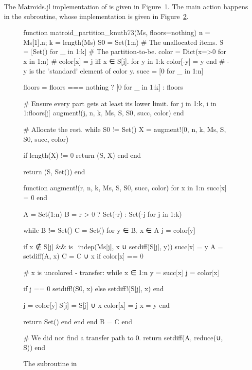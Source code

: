 The Matroids.jl implementation of  is given in Figure~\ref{code:matroid_partition_knuth73}. The main action happens in the  subroutine, whose implementation is given in Figure~\ref{code:augment}. 

\begin{figure}
\begin{jllisting}
    
function matroid_partition_knuth73(Ms, floors=nothing)
  n = Ms[1].n; k = length(Ms)
  S0 = Set(1:n) # The unallocated items.
  S = [Set() for _ in 1:k] # The partition-to-be.
  color = Dict(x=>0 for x in 1:n) # color[x] = j iff x ∈ S[j].
  for y in 1:k color[-y] = y end # -y is the 'standard' element of color y.
  succ = [0 for _ in 1:n]

  floors = floors === nothing ? [0 for _ in 1:k] : floors

  # Ensure every part gets at least its lower limit.
  for j in 1:k, i in 1:floors[j]
    augment!(j, n, k, Ms, S, S0, succ, color)
  end

  # Allocate the rest.
  while S0 != Set()
    X = augment!(0, n, k, Ms, S, S0, succ, color)
    
    if length(X) != 0
      return (S, X)
    end
  end

  return (S, Set())
end
    
\end{jllisting}
\caption{}
\label{code:matroid_partition_knuth73}
\end{figure}

\begin{figure}[ht!]
\begin{jllisting}

function augment!(r, n, k, Ms, S, S0, succ, color)
  for x in 1:n succ[x] = 0 end
  
  A = Set(1:n)
  B = r > 0 ? Set(-r) : Set(-j for j in 1:k)
  
  while B != Set()
    C = Set()
    for y ∈ B, x ∈ A
      j = color[y]

      if x ∉ S[j] && is_indep(Ms[j], x ∪ setdiff(S[j], y))
        succ[x] = y
        A = setdiff(A, x)
        C = C ∪ x
        if color[x] == 0 

          # x is uncolored - transfer:
          while x ∈ 1:n
            y = succ[x]
            j = color[x]
            
            if j == 0 setdiff!(S0, x) else setdiff!(S[j], x) end
        
            j = color[y]
            S[j] = S[j] ∪ x
            color[x] = j
            x = y
          end

          return Set() 
        end
      end
    end
    B = C
  end

  # We did not find a transfer path to 0.
  return setdiff(A, reduce(∪, S))
end

\end{jllisting}
\caption{The  subroutine in }
\label{code:augment}
\end{figure}